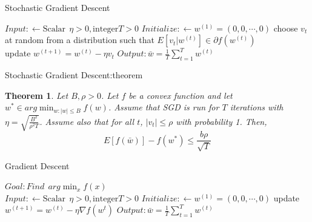 \documentclass{beamer}
\newtheorem{thm}{Theorem}[subsection]
\begin{document}
\begin{frame}{Stochastic Gradient Descent}
	\begin{algorithm}[H]
		$Input: \gets \text{Scalar} \ \  \eta>0, \text{integer} T>0$ \;
		$Initialize: \gets w^{(1)} = (0,0,\cdots,0)$\;
		{    choose $v_t$ at random from a distribution such that $E[v_t|w^{(t)}] \in \partial f(w^{(t)})$
			\\
			 update			$w^{(t+1)} = w^{(t)} - \eta v_t$\;
							}
	$Output: \bar{w} = \frac{1}{T} \sum^{T}_{t=1} w^{(t)}$
	\caption{Stochastic Gradient Descent(SGD)}
	\end{algorithm}
\end{frame}
\begin{frame}{Stochastic Gradient Descent:theorem}
	\begin{thm}	
		Let $B,\rho>0$. Let $f$ be a convex function and let $w^* \in arg\min_{w:|w| \leq B} f(w)$. Assume that SGD is run for $T$ iterations with $\eta = \sqrt{\frac{B^2}{\rho^2 T}}$. Assume also that for all $t$, $|v_t| \leq \rho$ with probability 1. Then,
		\[E[f(\bar{w})] - f(w^*) \leq \frac{b \rho}{\sqrt{T}}\]
	\end{thm}
\end{frame}
\begin{frame}{Gradient Descent}
	\begin{algorithm}[H]
		$Goal:Find \ \ arg\min_x f(x)$ \\
		$Input: \gets \text{Scalar} \ \  \eta>0, \text{integer} T>0$ \;
		$Initialize: \gets w^{(1)} = (0,0,\cdots,0)$\;
		{   
			update			$w^{(t+1)} = w^{(t)} - \eta \nabla f(w^t)$\;
							}
	$Output: \bar{w} = \frac{1}{T} \sum^{T}_{t=1} w^{(t)}$
	\caption{Gradient Descent(GD)}
	\end{algorithm}
\end{frame}
\end{document}
